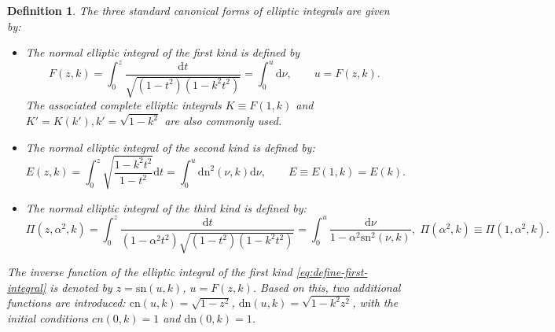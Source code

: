 \documentclass[11pt,reqno]{amsart}
\newcommand{\sn}{\mathrm{sn}}
\newcommand{\cn}{\mathrm{cn}}
\newcommand{\dn}{\mathrm{dn}}
\newcommand{\dd}{\mathrm{d}}
\newtheorem{define}{Definition}
\numberwithin{equation}{section}
\begin{document}
\begin{define}\label{define:elliptic-function}
	The three standard canonical forms of elliptic integrals are given by:
	\begin{itemize}
		\item The normal elliptic integral of the first kind is defined by
		\begin{equation}\label{eq:define-first-integral}
			F(z,k) = \int_{0}^{z}\frac{\dd t}{\sqrt{(1-t^2)(1-k^2t^2)}}=\int_0^{u} \dd \nu, \qquad u = F(z,k).
		\end{equation}
		The associated complete elliptic integrals $K\equiv F(1,k)$ and $K'=K(k'), k'=\sqrt{1-k^2}$ are also commonly used. 
		\item The normal elliptic integral of the second kind is defined by:
		\begin{equation}\label{eq:define-second-integral}
			E(z,k) = \int_{0}^{z}\sqrt{\frac{1-k^2 t^2}{1-t^2}}\dd t=\int_0^{u}\dn^2(\nu,k)\dd \nu, \qquad 
			E\equiv E(1,k)=E(k).
		\end{equation}
		\item The normal elliptic integral of the third kind is defined by:
		\begin{equation}\label{eq:define-third-integral}
		 \!	\Pi(z,\alpha^2,k) \! =\! \int_{0}^{z}\frac{\dd t}{(1-\alpha^2 t^2)\sqrt{(1-t^2)(1-k^2t^2)}} \! =\! \int_0^{u}\frac{\dd \nu}{1-\alpha^2\sn^2(\nu,k)},\,\, \Pi(\alpha^2,k)\equiv \Pi(1,\alpha^2,k).	
		\end{equation}
	\end{itemize}
	The inverse function of the elliptic integral of the first kind \eqref{eq:define-first-integral} is denoted by $z=\sn(u,k)$, $u = F(z,k)$. 
	Based on this, two additional functions are introduced: $\cn(u,k)=\sqrt{1-z^2}$, $\dn(u,k)=\sqrt{1-k^2z^2}$, with the initial conditions $cn(0,k)=1$ and $\dn(0,k)=1$.
\end{define}
\end{document}
